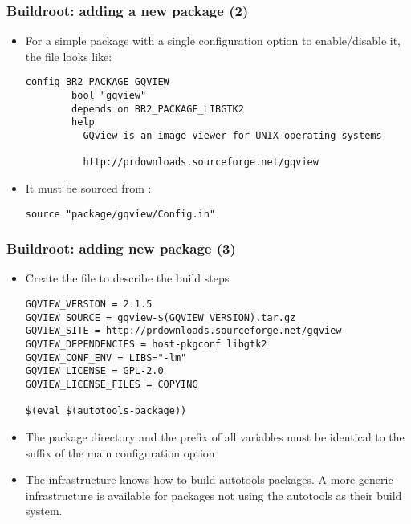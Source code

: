 \begin{frame}[fragile]
  \frametitle{Buildroot: adding a new package (2)}
  \begin{itemize}
  \item For a simple package with a single configuration option to
    enable/disable it, the  file looks like:
\footnotesize
\begin{block}{}
\begin{verbatim}
config BR2_PACKAGE_GQVIEW
        bool "gqview"
        depends on BR2_PACKAGE_LIBGTK2
        help
          GQview is an image viewer for UNIX operating systems

          http://prdownloads.sourceforge.net/gqview
\end{verbatim}
\end{block}
\normalsize
  \item It must be sourced from :
\small
\begin{block}{}
\begin{verbatim}
source "package/gqview/Config.in"
\end{verbatim}
\end{block}
  \end{itemize}
\end{frame}

\begin{frame}[fragile]
  \frametitle{Buildroot: adding new package (3)}
  \begin{itemize}
  \item Create the  file to describe the build steps
\scriptsize
\begin{block}{}
\begin{verbatim}
GQVIEW_VERSION = 2.1.5
GQVIEW_SOURCE = gqview-$(GQVIEW_VERSION).tar.gz
GQVIEW_SITE = http://prdownloads.sourceforge.net/gqview
GQVIEW_DEPENDENCIES = host-pkgconf libgtk2
GQVIEW_CONF_ENV = LIBS="-lm"
GQVIEW_LICENSE = GPL-2.0
GQVIEW_LICENSE_FILES = COPYING

$(eval $(autotools-package))
\end{verbatim}
\end{block}
\normalsize
\item The package directory and the prefix of all variables must be
  identical to the suffix of the main configuration option
\item The  infrastructure knows how to build
  autotools packages. A more generic 
  infrastructure is available for packages not using the autotools
  as their build system.
\end{itemize}
\end{frame}

